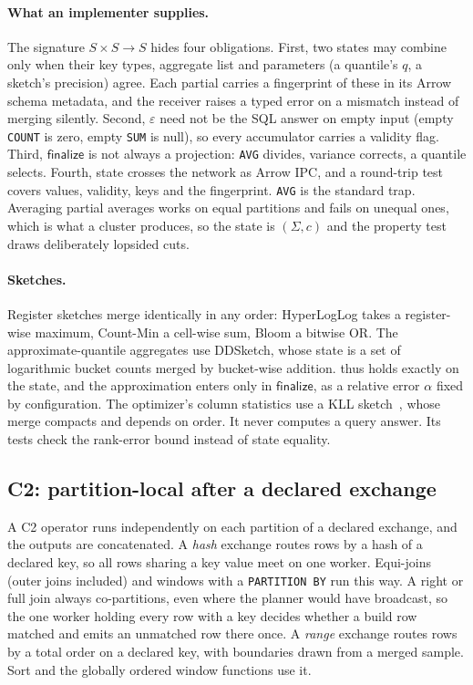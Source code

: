 \documentclass[10pt,twocolumn,letterpaper]{article}   %
\newcommand{\Cb}{\textsc{C2}}
\begin{document}
\paragraph{What an implementer supplies.} The signature $S\times S\rightarrow S$ hides four
obligations. First, two states may combine only when their key types, aggregate list and
parameters (a quantile's $q$, a sketch's precision) agree. Each partial carries a fingerprint
of these in its Arrow schema metadata, and the receiver raises a typed error on a mismatch
instead of merging silently. Second, $\varepsilon$ need not be the SQL answer on empty input
(empty \texttt{COUNT} is zero, empty \texttt{SUM} is null), so every accumulator carries a
validity flag. Third, $\mathsf{finalize}$ is not always a projection: \texttt{AVG} divides,
variance corrects, a quantile selects. Fourth, state crosses the network as Arrow IPC, and a
round-trip test covers values, validity, keys and the fingerprint. \texttt{AVG} is the
standard trap. Averaging partial averages works on equal partitions and fails on unequal ones,
which is what a cluster produces, so the state is $(\Sigma, c)$ and the property test draws
deliberately lopsided cuts.

\paragraph{Sketches.} Register sketches merge identically in any order: HyperLogLog takes a
register-wise maximum, Count-Min a cell-wise sum, Bloom a bitwise OR. The approximate-quantile
aggregates use DDSketch, whose state is a set of logarithmic bucket counts merged by
bucket-wise addition.  thus holds exactly on the state, and the approximation
enters only in $\mathsf{finalize}$, as a relative error $\alpha$ fixed by configuration. The
optimizer's column statistics use a KLL sketch~\cite{karnin2016kll}, whose merge compacts and
depends on order. It never computes a query answer. Its tests check the rank-error bound
instead of state equality.

\subsection{\Cb{}: partition-local after a declared exchange}

A \Cb{} operator runs independently on each partition of a declared exchange, and the outputs
are concatenated. A \emph{hash} exchange routes rows by a hash of a declared key, so all rows
sharing a key value meet on one worker. Equi-joins (outer joins included) and windows with a
\texttt{PARTITION BY} run this way. A right or full join always co-partitions, even where the
planner would have broadcast, so the one worker holding every row with a key decides whether a
build row matched and emits an unmatched row there once. A
\emph{range} exchange routes rows by a total order on a declared key, with boundaries drawn
from a merged sample. Sort and the globally ordered window functions use it.
\end{document}
